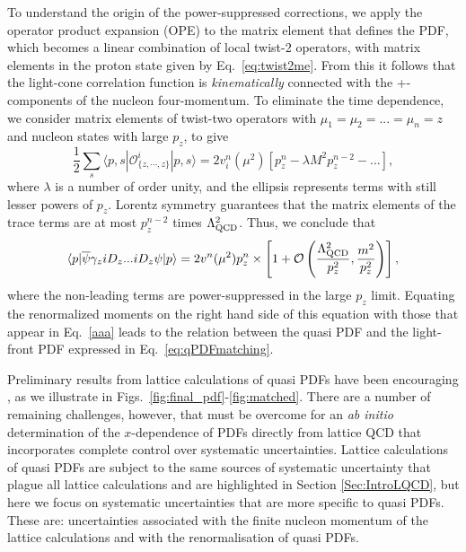 To understand the origin of the power-suppressed corrections, we apply the operator product expansion (OPE) to the matrix element that defines the PDF, which becomes a linear combination of local twist-2 operators, with matrix elements in the proton state given by Eq.~\eqref{eq:twist2me}. From this it follows that the light-cone correlation function is {\it kinematically} connected with the +-components of the nucleon four-momentum. To eliminate the time dependence, we consider matrix elements of twist-two operators with $\mu_1=\mu_2=...=\mu_n=z$ and nucleon states with large $p_z$, to give
\begin{equation}
\frac{1}{2} \sum_s \langle p,s|\mathcal{O}^i_{\{z,\cdots,z\}}|p,s\rangle = 2v_i^n(\mu^2)\left[p_z^n-\lambda M^2 p_z^{n-2}-...\right], 
\end{equation}
where $\lambda$ is a number of order unity, and the ellipsis represents terms
with still lesser powers of $p_z$. Lorentz symmetry guarantees that the matrix elements of the trace terms are at most
$p_z^{n-2}$ times $\Lambda^2_{\rm QCD}$. Thus, we conclude that
\begin{equation}
      \langle p| {\overline \psi}\gamma_ziD_z ... iD_z \psi|p\rangle
       = 2v^n(\mu^2) p_z^n\times \left[ 1 + {\cal O}\left(\frac{\Lambda^2_{\rm QCD}}{p_z^2},  \frac{m^2}{p_z^2}\right)\right],
\end{equation}
where the non-leading terms are power-suppressed in the large $p_z$ limit. Equating the renormalized moments on the right hand side of this equation with those that appear in Eq.~\eqref{aaa}
leads to the relation between the quasi PDF and the light-front PDF expressed in Eq.~\eqref{eq:qPDFmatching}.

Preliminary results from lattice calculations of quasi PDFs have been encouraging \cite{Lin:2014zya,Alexandrou:2015rja,Chen:2016utp,Alexandrou:2016jqi}, as we illustrate in Figs.~\ref{fig:final_pdf}-\ref{fig:matched}. There are a number of remaining challenges, however, that must be overcome for an {\it ab initio} determination of the $x$-dependence of PDFs directly from lattice QCD that incorporates complete control over systematic uncertainties. Lattice calculations of quasi PDFs are subject to the same sources of systematic uncertainty that plague all lattice calculations and are highlighted in Section \ref{Sec:IntroLQCD}, but here we focus on systematic uncertainties that are more specific to quasi PDFs. These are: uncertainties associated with the finite nucleon momentum of the lattice calculations and with the renormalisation of quasi PDFs.

